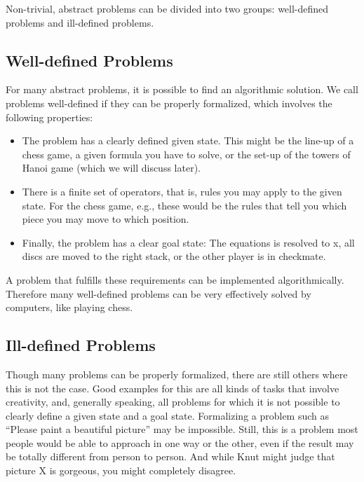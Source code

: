 \documentclass[
]{krantz}
\begin{document}
Non-trivial, abstract problems can be divided into two groups: well-defined problems and ill-defined problems.

\hypertarget{well-defined-problems}{%
\subsection*{Well-defined Problems}\label{well-defined-problems}}


For many abstract problems, it is possible to find an algorithmic solution. We call problems well-defined if they can be properly formalized, which involves the following properties:

\begin{itemize}
\item
  The problem has a clearly defined given state. This might be the line-up of a chess game, a given formula you have to solve, or the set-up of the towers of Hanoi game (which we will discuss later).
\item
  There is a finite set of operators, that is, rules you may apply to the given state. For the chess game, e.g., these would be the rules that tell you which piece you may move to which position.
\item
  Finally, the problem has a clear goal state: The equations is resolved to x, all discs are moved to the right stack, or the other player is in checkmate.
\end{itemize}

A problem that fulfills these requirements can be implemented algorithmically. Therefore many well-defined problems can be very effectively solved by computers, like playing chess.

\hypertarget{ill-defined-problems}{%
\subsection*{Ill-defined Problems}\label{ill-defined-problems}}


Though many problems can be properly formalized, there are still others where this is not the case. Good examples for this are all kinds of tasks that involve creativity, and, generally speaking, all problems for which it is not possible to clearly define a given state and a goal state. Formalizing a problem such as ``Please paint a beautiful picture'' may be impossible. Still, this is a problem most people would be able to approach in one way or the other, even if the result may be totally different from person to person. And while Knut might judge that picture X is gorgeous, you might completely disagree.
\end{document}
